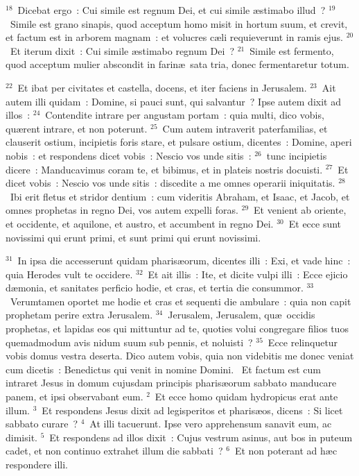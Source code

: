 ${}^{18}$~Dicebat ergo~: Cui simile est regnum Dei, et cui simile \ae stimabo illud~?
${}^{19}$~Simile est grano sinapis, quod acceptum homo misit in hortum suum, et crevit, et factum est in arborem magnam~: et volucres c\ae li requieverunt in ramis ejus.
${}^{20}$~Et iterum dixit~: Cui simile \ae stimabo regnum Dei~?
${}^{21}$~Simile est fermento, quod acceptum mulier abscondit in farin\ae\ sata tria, donec fermentaretur totum.


${}^{22}$~Et ibat per civitates et castella, docens, et iter faciens in Jerusalem.
${}^{23}$~Ait autem illi quidam~: Domine, si pauci sunt, qui salvantur~? Ipse autem dixit ad illos~:
${}^{24}$~Contendite intrare per angustam portam~: quia multi, dico vobis, qu\ae rent intrare, et non poterunt.
${}^{25}$~Cum autem intraverit paterfamilias, et clauserit ostium, incipietis foris stare, et pulsare ostium, dicentes~: Domine, aperi nobis~: et respondens dicet vobis~: Nescio vos unde sitis~:
${}^{26}$~tunc incipietis dicere~: Manducavimus coram te, et bibimus, et in plateis nostris docuisti.
${}^{27}$~Et dicet vobis~: Nescio vos unde sitis~: discedite a me omnes operarii iniquitatis.
${}^{28}$~Ibi erit fletus et stridor dentium~: cum videritis Abraham, et Isaac, et Jacob, et omnes prophetas in regno Dei, vos autem expelli foras.
${}^{29}$~Et venient ab oriente, et occidente, et aquilone, et austro, et accumbent in regno Dei.
${}^{30}$~Et ecce sunt novissimi qui erunt primi, et sunt primi qui erunt novissimi.


${}^{31}$~In ipsa die accesserunt quidam pharis\ae orum, dicentes illi~: Exi, et vade hinc~: quia Herodes vult te occidere.
${}^{32}$~Et ait illis~: Ite, et dicite vulpi illi~: Ecce ejicio d\ae monia, et sanitates perficio hodie, et cras, et tertia die consummor.
${}^{33}$~Verumtamen oportet me hodie et cras et sequenti die ambulare~: quia non capit prophetam perire extra Jerusalem.
${}^{34}$~Jerusalem, Jerusalem, qu\ae\ occidis prophetas, et lapidas eos qui mittuntur ad te, quoties volui congregare filios tuos quemadmodum avis nidum suum sub pennis, et noluisti~?
${}^{35}$~Ecce relinquetur vobis domus vestra deserta. Dico autem vobis, quia non videbitis me donec veniat cum dicetis~: Benedictus qui venit in nomine Domini.
~Et factum est cum intraret Jesus in domum cujusdam principis pharis\ae orum sabbato manducare panem, et ipsi observabant eum.
${}^{2}$~Et ecce homo quidam hydropicus erat ante illum.
${}^{3}$~Et respondens Jesus dixit ad legisperitos et pharis\ae os, dicens~: Si licet sabbato curare~?
${}^{4}$~At illi tacuerunt. Ipse vero apprehensum sanavit eum, ac dimisit.
${}^{5}$~Et respondens ad illos dixit~: Cujus vestrum asinus, aut bos in puteum cadet, et non continuo extrahet illum die sabbati~?
${}^{6}$~Et non poterant ad h\ae c respondere illi.



